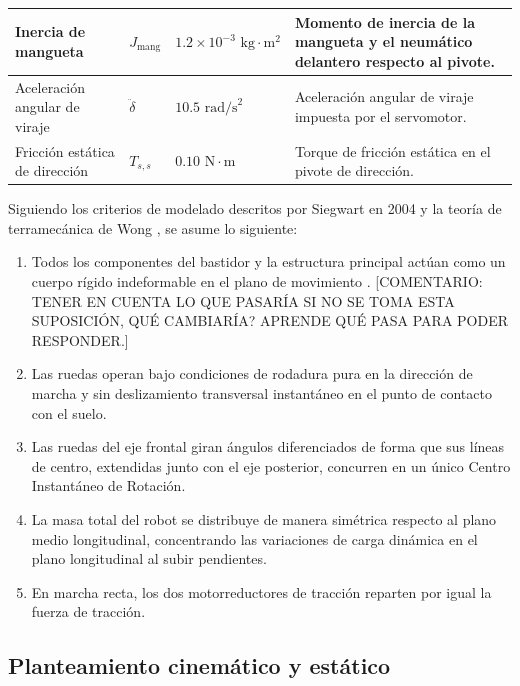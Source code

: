 \documentclass[../../General.tex]{subfiles}
\begin{document}
\begin{center}
\begin{xltabular}{\textwidth}{|p{3.5cm}|>{\centering\arraybackslash}p{2.5cm}|>{\centering\arraybackslash}p{2.5cm}|>{\centering\arraybackslash}X|}
        Inercia de mangueta & $J_{\text{mang}}$ & $1.2 \times 10^{-3}\text{ kg}\cdot\text{m}^2$ & Momento de inercia de la mangueta y el neumático delantero respecto al pivote. \\ \hline
        Aceleración angular de viraje & $\ddot{\delta}$ & $10.5\text{ rad/s}^2$ & Aceleración angular de viraje impuesta por el servomotor. \\ \hline
        Fricción estática de dirección & $T_{s,s}$ & $0.10\text{ N}\cdot\text{m}$ & Torque de fricción estática en el pivote de dirección. \\ \hline
	\end{xltabular}
\end{center}

Siguiendo los criterios de modelado descritos por Siegwart en 2004 \citep{siegwart2004mobile} y la teoría de terramecánica de Wong \citep{wong2022ground}, se asume lo siguiente:
\begin{enumerate}
    \item Todos los componentes del bastidor y la estructura principal actúan como un cuerpo rígido indeformable en el plano de movimiento \citep{gillespie1992vehicle}. [COMENTARIO: TENER EN CUENTA LO QUE PASARÍA SI NO SE TOMA ESTA SUPOSICIÓN, QUÉ CAMBIARÍA? APRENDE QUÉ PASA PARA PODER RESPONDER.]
    \item Las ruedas operan bajo condiciones de rodadura pura en la dirección de marcha y sin deslizamiento transversal instantáneo en el punto de contacto con el suelo.
    \item Las ruedas del eje frontal giran ángulos diferenciados de forma que sus líneas de centro, extendidas junto con el eje posterior, concurren en un único Centro Instantáneo de Rotación.
    \item La masa total del robot se distribuye de manera simétrica respecto al plano medio longitudinal, concentrando las variaciones de carga dinámica en el plano longitudinal al subir pendientes.
    \item En marcha recta, los dos motorreductores de tracción reparten por igual la fuerza de tracción.
\end{enumerate}

\subsection{Planteamiento cinemático y estático}
\end{document}
